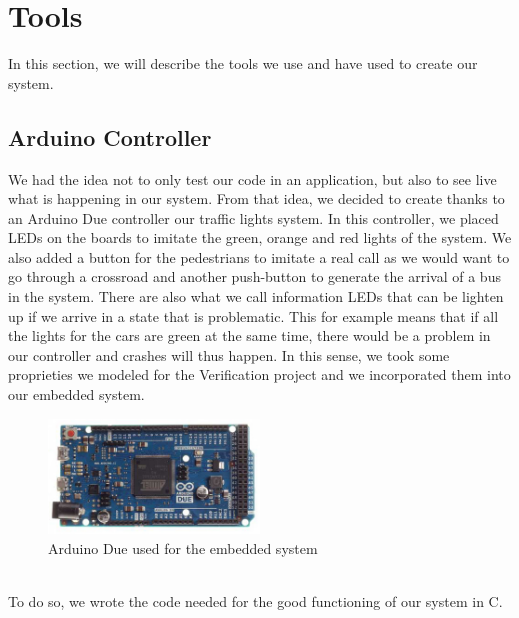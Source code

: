 \section{Tools}
In this section, we will describe the tools we use and have used to create our system.

\subsection{Arduino Controller}
We had the idea not to only test our code in an application, but also to see live what is happening in our system. From that idea, we decided to create thanks to an Arduino Due controller our traffic lights system. In this controller, we placed LEDs on the boards to imitate the green, orange and red lights of the system. We also added a button for the pedestrians to imitate a real call as we would want to go through a crossroad and another push-button to generate the arrival of a bus in the system. There are also what we call information LEDs that can be lighten up if we arrive in a state that is problematic. This for example means that if all the lights for the cars are green at the same time, there would be a problem in our controller and crashes will thus happen. In this sense, we took some proprieties we modeled for the Verification project and we incorporated them into our embedded system.
\begin{figure}[!ht]\label{fig:arduino}
  \centering
    \includegraphics[width=0.5\textwidth]{picture/arduino.jpg}
    \caption{Arduino Due used for the embedded system}
\end{figure} \\
To do so, we wrote the code needed for the good functioning of our system in C.

